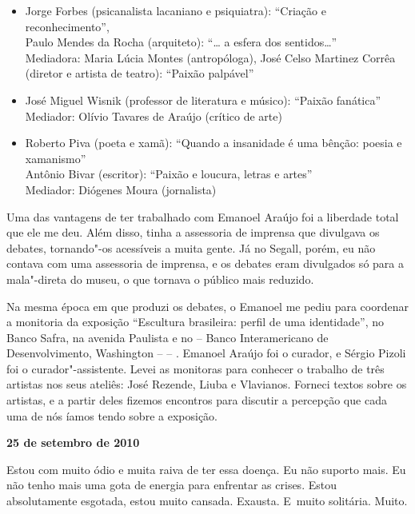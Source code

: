 \begin{itemize}
\item
  Jorge Forbes (psicanalista lacaniano e psiquiatra): ``Criação e
  reconhecimento'', \\Paulo Mendes da Rocha (arquiteto): ``… a
  esfera dos sentidos…''\\Mediadora: Maria Lúcia Montes
  (antropóloga), José Celso Martinez Corrêa (diretor e artista de
  teatro): ``Paixão palpável''
\item
  José Miguel Wisnik (professor de literatura e músico): ``Paixão
  fanática''\\Mediador: Olívio Tavares de Araújo (crítico de arte)
\item
  Roberto Piva (poeta e xamã): ``Quando a insanidade é uma bênção:
  poesia e xamanismo''\\Antônio Bivar (escritor): ``Paixão e loucura,
  letras e artes''\\Mediador: Diógenes Moura (jornalista)
\end{itemize}

Uma das vantagens de ter trabalhado com Emanoel Araújo foi a liberdade
total que ele me deu. Além disso, tinha a assessoria de imprensa que
divulgava os debates, tornando"-os acessíveis a muita gente. Já no
Segall, porém, eu não contava com uma assessoria de imprensa, e os
debates eram divulgados só para a mala"-direta do museu, o que tornava o
público mais reduzido.

Na mesma época em que produzi os debates, o Emanoel me pediu para
coordenar a monitoria da exposição ``Escultura brasileira: perfil de uma
identidade'', no Banco Safra, na avenida Paulista e no  -- Banco
Interamericano de Desenvolvimento, Washington --  -- . Emanoel
Araújo foi o curador, e Sérgio Pizoli foi o curador"-assistente. Levei as
monitoras para conhecer o trabalho de três artistas nos seus ateliês:
José Rezende, Liuba e Vlavianos. Forneci textos sobre os artistas, e a
partir deles fizemos encontros para discutir a percepção que cada uma de
nós íamos tendo sobre a exposição.

\begin{flushright}\textbf{25 de setembro de 2010}\end{flushright}


Estou com muito ódio e muita raiva de ter essa doença. Eu não suporto
mais. Eu não tenho mais uma gota de energia para enfrentar as crises.
Estou absolutamente esgotada, estou muito cansada. Exausta. E~muito
solitária. Muito.

